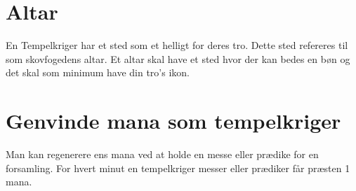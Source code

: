 \section{Altar}
En Tempelkriger har et sted som et helligt for deres tro. Dette sted refereres til som skovfogedens altar. Et altar skal have et sted hvor der kan bedes en bøn og det skal som minimum have din tro's ikon.

\section{Genvinde mana som tempelkriger}
Man kan regenerere ens mana ved at holde en messe eller prædike for en forsamling. For hvert minut en tempelkriger messer eller prædiker får præsten 1 mana.
